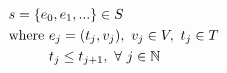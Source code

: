 \documentclass[preview]{standalone}
\begin{document}
\begin{align*}
  \omit \rlap{$ s = \{e_0, e_1,...\} \in S $} \\
  \text{where } & e_j = (t_j, v_j),\ v_j \in V,\ t_j \in T \\
                & t_j \leq t_{j+1},\ \forall\ j \in \mathbb{N} 
\end{align*}
\end{document}
